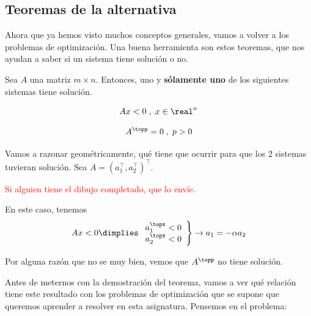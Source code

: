 \subsection{Teoremas de la alternativa}

Ahora que ya hemos visto muchos conceptos generales, vamos a volver a los problemas de optimización.
Una buena herramienta son estos teoremas, que nos ayudan a saber si un sistema tiene solución o no.

\begin{lemma}
Sea $A$ una matriz $m\times n$. Entonces, uno y \textbf{sólamente uno} de los siguientes sistemas tiene solución.

\begin{equation}
Ax < 0\;,\; x\in\real^n
\label{eq:Gordan_1}
\end{equation}

\begin{equation}
A^\topp = 0\;,\; p > 0
\label{eq:Gordan_2}
\end{equation}
\end{lemma}


Vamos a razonar geométricamente, qué tiene que ocurrir para que los 2 sistemas tuvieran solución. Sea $A = (a_1^\top,a_2^\top)^\top$.

\textcolor{red}{Si alguien tiene el dibujo completado, que lo envíe.}

\begin{figure}[h]
\centering
{}
\end{figure}

En este caso, tenemos \[Ax < 0 \dimplies \left.\begin{array}{c}a_1^\topx < 0\\a_2^\topx<0\end{array}\right\} \to a_1 = -\alpha a_2\]


Por alguna razón que no se muy bien, vemos que $A^\topp$ no tiene solución.


Antes de meternos con la demostración del teorema, vamos a ver qué relación tiene este resultado con los problemas de optimización que se supone que queremos aprender a resolver en esta asignatura.
Pensemos en el problema:
\begin{ioprob}
\end{ioprob}

